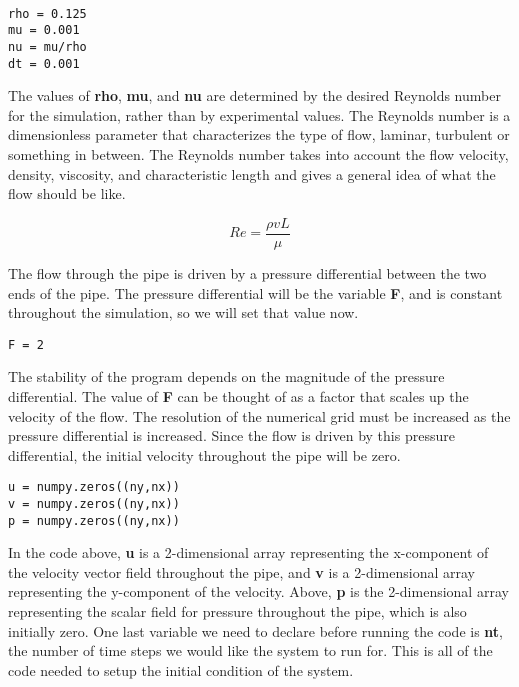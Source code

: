 \begin{lstlisting}

rho = 0.125
mu = 0.001
nu = mu/rho
dt = 0.001

\end{lstlisting}

The values of \textbf{rho}, \textbf{mu}, and \textbf{nu} are determined by the desired Reynolds number for the simulation, rather than by experimental values.
The Reynolds number is a dimensionless parameter that characterizes the type of flow, laminar, turbulent or something in between.
The Reynolds number takes into account the flow velocity, density, viscosity, and characteristic length and gives a general idea of what the flow should be like.

\begin{equation}
Re = \frac{\rho{v}{L}}{\mu}
\end{equation}

The flow through the pipe is driven by a pressure differential between the two ends of the pipe.
The pressure differential will be the variable \textbf{F}, and is constant throughout the simulation, so we will set that value now.

\begin{lstlisting}
F = 2
\end{lstlisting}

The stability of the program depends on the magnitude of the pressure differential.
The value of \textbf{F} can be thought of as a factor that scales up the velocity of the flow.
The resolution of the numerical grid must be increased as the pressure differential is increased.
Since the flow is driven by this pressure differential, the initial velocity throughout the pipe will be zero.

\begin{lstlisting}
u = numpy.zeros((ny,nx))
v = numpy.zeros((ny,nx))
p = numpy.zeros((ny,nx))
\end{lstlisting}

In the code above, \textbf{u} is a 2-dimensional array representing the x-component of the velocity vector field throughout the pipe, and \textbf{v} is a 2-dimensional array representing the y-component of the velocity.
Above, \textbf{p} is the 2-dimensional array representing the scalar field for pressure throughout the pipe, which is also initially zero.
One last variable we need to declare before running the code is \textbf{nt}, the number of time steps we would like the system to run for.
This is all of the code needed to setup the initial condition of the system.
